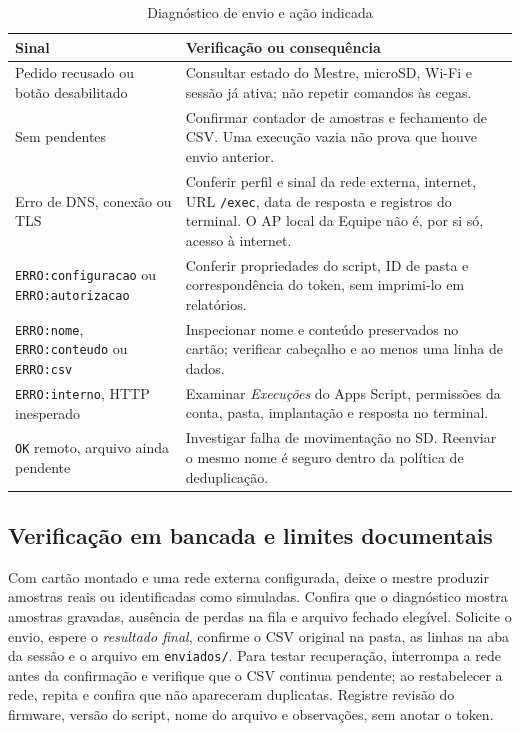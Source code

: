 \begin{table}[htbp]\centering\small
\caption{Diagnóstico de envio e ação indicada}\label{tab:google_falhas}
\begin{tabularx}{\textwidth}{@{}p{4.0cm}X@{}}\toprule
Sinal & Verificação ou consequência\\\midrule
Pedido recusado ou botão desabilitado & Consultar estado do Mestre, microSD, Wi-Fi e sessão já ativa; não repetir comandos às cegas.\\
Sem pendentes & Confirmar contador de amostras e fechamento de CSV. Uma execução vazia não prova que houve envio anterior.\\
Erro de DNS, conexão ou TLS & Conferir perfil e sinal da rede externa, internet, URL \texttt{/exec}, data de resposta e registros do terminal. O AP local da Equipe não é, por si só, acesso à internet.\\
\texttt{ERRO:configuracao} ou \texttt{ERRO:autorizacao} & Conferir propriedades do script, ID de pasta e correspondência do token, sem imprimi-lo em relatórios.\\
\texttt{ERRO:nome}, \texttt{ERRO:conteudo} ou \texttt{ERRO:csv} & Inspecionar nome e conteúdo preservados no cartão; verificar cabeçalho e ao menos uma linha de dados.\\
\texttt{ERRO:interno}, HTTP inesperado & Examinar \emph{Execuções} do Apps Script, permissões da conta, pasta, implantação e resposta no terminal.\\
\texttt{OK} remoto, arquivo ainda pendente & Investigar falha de movimentação no SD. Reenviar o mesmo nome é seguro dentro da política de deduplicação.\\\bottomrule
\end{tabularx}
\end{table}

\subsection{Verificação em bancada e limites documentais}
Com cartão montado e uma rede externa configurada, deixe o mestre produzir amostras reais ou identificadas como simuladas. Confira que o diagnóstico mostra amostras gravadas, ausência de perdas na fila e arquivo fechado elegível. Solicite o envio, espere o \emph{resultado final}, confirme o CSV original na pasta, as linhas na aba da sessão e o arquivo em \texttt{enviados/}. Para testar recuperação, interrompa a rede antes da confirmação e verifique que o CSV continua pendente; ao restabelecer a rede, repita e confira que não apareceram duplicatas. Registre revisão do firmware, versão do script, nome do arquivo e observações, sem anotar o token.


